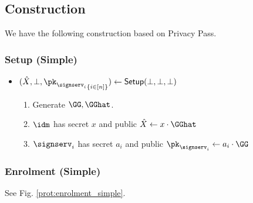 \begin{itemize}
\begin{definition}
\end{definition}
\end{itemize}

\subsection{Construction}
We have the following construction based on Privacy Pass.

\subsubsection{Setup (Simple)}
\begin{itemize}
    \item $(\hat{X}, \bot, {\pk_{\signserv_i}}_{\{i \in [n]\}}) \gets \mathsf{Setup}(\bot, \bot, \bot)$
    \begin{enumerate}
	\item Generate $\GG, \GGhat$.
	\item $\idm$ has secret $x$ and public $\hat{X} \gets x\cdot \GGhat$
    \item $\signserv_i$ has secret $a_i$ and public $\pk_{\signserv_i} \gets a_i\cdot\GG$
\end{enumerate}
\end{itemize}

\subsubsection{Enrolment (Simple)}
See Fig. \ref{prot:enrolment_simple}.
\begin{figure*}[h!]
\caption{Enrolment (Simple)}
\label{prot:enrolment_simple}
\end{figure*}


